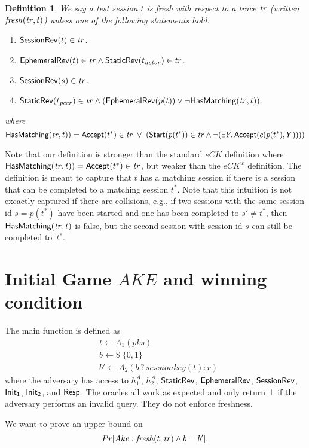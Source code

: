 \documentclass[]{article}
\newtheorem{definition}{Definition}
\begin{document}
\begin{definition}
We say a test session $t$ is fresh with respect to a trace $\mathit{tr}$ (written $\mathit{fresh}(\mathit{tr}, t)$)
  unless one of the following statements hold:
\begin{enumerate}
\item $\mathsf{SessionRev}(t) \in \mathit{tr}$.
\item $\mathsf{EphemeralRev}(t) \in \mathit{tr} \land \mathsf{StaticRev}(t_{\mathit{actor}}) \in \mathit{tr}$.
\item $\mathsf{SessionRev}(s) \in \mathit{tr}$.
\item $\mathsf{StaticRev}(t_{\mathit{peer}}) \in \mathit{tr} \land (\mathsf{EphemeralRev}(p(t)) \lor \neg \mathsf{HasMatching}(\mathit{tr}, t))$.
\end{enumerate}
where
\[
  \mathsf{HasMatching}(\mathit{tr}, t)) = \mathsf{Accept}(t^*) \in \mathit{tr}\; \lor\; (\mathsf{Start}(p(t^*)) \in \mathit{tr}
    \land \neg (\exists Y.\, \mathsf{Accept}(c(p(t^*),Y))))
\]
\end{definition}

Note that our definition is stronger than the standard $eCK$ definition where
  $\mathsf{HasMatching}(\mathit{tr}, t)) = \mathsf{Accept}(t^*) \in \mathit{tr}$, but weaker than the
  $eCK^w$ definition.
The definition is meant to capture that $t$ has a matching session if there is a session
  that can be completed to a matching session $t^*$.
Note that this intuition is not excactly captured if there are collisions, e.g., if two sessions
  with the same session id $s=p(t^*)$ have been started and one has been completed to $s' \neq t^*$,
  then $\mathsf{HasMatching}(\mathit{tr}, t)$ is false, but the second session with session id $s$ can
  still be completed to~$t^*$. 

\section{Initial Game $AKE$ and winning condition}

The main function is defined as
\begin{align*}
& t \leftarrow A_1(pks) \\
& b \leftarrow\!\!\$ \; \{0,1\} \\
& b' \leftarrow A_2(b\, ?\, sessionkey(t) : r)
\end{align*}
where the adversary has access to $h_1^A$, $h_2^A$, $\mathsf{StaticRev}$,
  $\mathsf{EphemeralRev}$, $\mathsf{SessionRev}$, $\mathsf{Init_1}$, $\mathsf{Init_2}$, and $\mathsf{Resp}$.
The oracles all work as expected and only return $\bot$ if the adversary
  performs an invalid query.
They do not enforce freshness.

We want to prove an upper bound on
\[
  Pr[Ake : \mathit{fresh}(t, \mathit{tr}) \land b = b'].
\]

\newcommand{\Ake}{\mathsf{AKE}}
\newcommand{\Ev}[1]{\mathit{Ev}_{#1}}
\newcommand{\fresh}{\mathit{fresh}}
\end{document}
